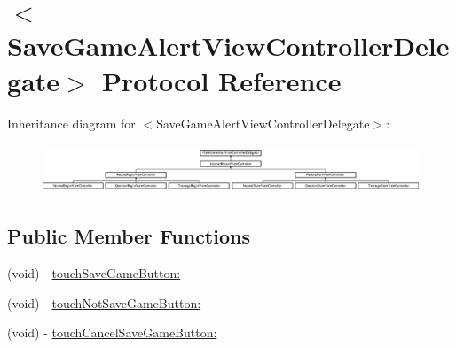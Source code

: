 \hypertarget{protocol_save_game_alert_view_controller_delegate-p}{
\section{$<$SaveGameAlertViewControllerDelegate$>$ Protocol Reference}
\label{protocol_save_game_alert_view_controller_delegate-p}
}
Inheritance diagram for $<$SaveGameAlertViewControllerDelegate$>$:\begin{figure}[H]
\begin{center}
\leavevmode
\includegraphics[height=1.458333cm]{protocol_save_game_alert_view_controller_delegate-p}
\end{center}
\end{figure}
\subsection*{Public Member Functions}
\begin{DoxyCompactItemize}
\item 
(void) -\/ \hyperlink{protocol_save_game_alert_view_controller_delegate-p_afa813696b1ef75b31cd912d3061a713b}{touchSaveGameButton:}
\item 
(void) -\/ \hyperlink{protocol_save_game_alert_view_controller_delegate-p_ab4dda179a5903e85ad51f2d4fefe5bdd}{touchNotSaveGameButton:}
\item 
(void) -\/ \hyperlink{protocol_save_game_alert_view_controller_delegate-p_ab6a7f1b224cfb0e548e4c307cb191238}{touchCancelSaveGameButton:}
\end{DoxyCompactItemize}


